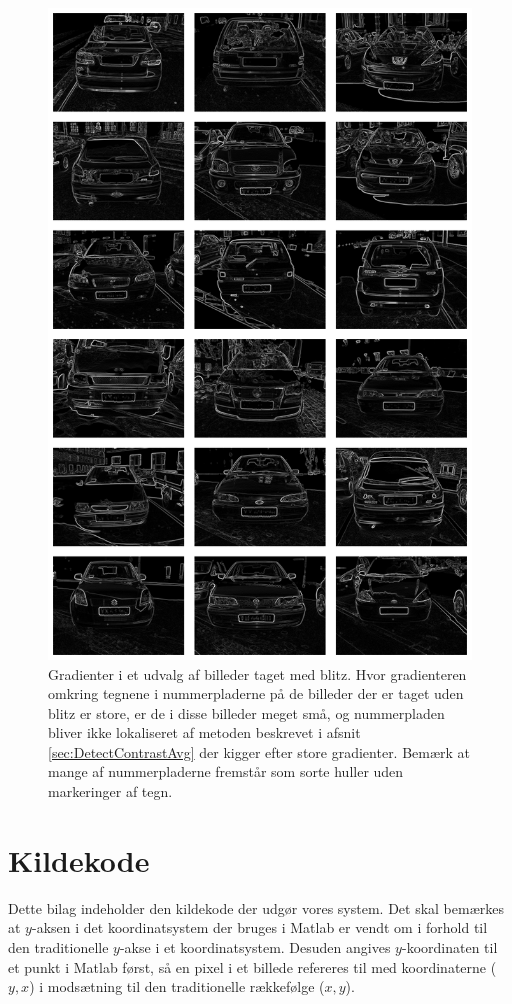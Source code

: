 \documentclass[11pt,a4paper,final]{article}
\begin{document}
\begin{figure}[htp]
\centering
\includegraphics[width=12cm]{appendix/illu/badgrads.png} 
\caption{Gradienter i et udvalg af billeder taget med blitz. Hvor gradienteren omkring tegnene i nummerpladerne på de billeder der er taget uden blitz er store, er de i disse billeder meget små, og nummerpladen bliver ikke lokaliseret af metoden beskrevet i afsnit \vref{sec:DetectContrastAvg} der kigger efter store gradienter. Bemærk at mange af nummerpladerne fremstår som sorte huller uden markeringer af tegn.}
\label{fig:illu:badgrads}
\end{figure}




\newpage
\section{Kildekode}
Dette bilag indeholder den kildekode der udgør vores system. Det skal bemærkes at $y$-aksen i det koordinatsystem der bruges i Matlab er vendt om i forhold til den traditionelle $y$-akse i et koordinatsystem. Desuden angives $y$-koordinaten til et punkt i Matlab først, så en pixel i et billede refereres til med koordinaterne ($y,x$) i modsætning til den traditionelle rækkefølge ($x,y$).
\end{document}
